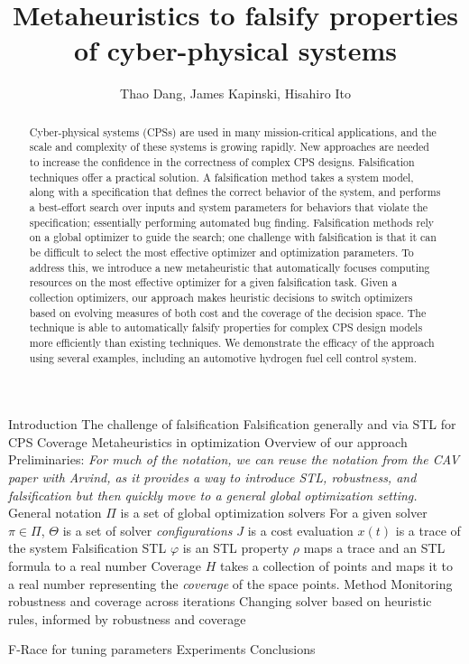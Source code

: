\documentclass[10pt,oneside,letterpaper]{article}
\title{Metaheuristics to falsify properties of cyber-physical systems}
\author{Thao Dang, James Kapinski, Hisahiro Ito}
\date{}
\begin{document}
\maketitle

\begin{abstract}
Cyber-physical systems (CPSs) are used in many mission-critical applications, and the scale and complexity of these systems is growing rapidly.
New approaches are needed to increase the confidence in the correctness of complex CPS designs.
Falsification techniques offer a practical solution. 
A falsification method takes a system model, along with a specification that defines the correct behavior of the system, and performs a best-effort search over inputs and system parameters for behaviors that violate the specification; essentially performing automated bug finding.
Falsification methods rely on a global optimizer to guide the search; one challenge with falsification is that it can be difficult to select the most effective optimizer and optimization parameters.
To address this, we introduce a new metaheuristic that automatically focuses computing resources on the most effective optimizer for a given falsification task.
Given a collection optimizers, our approach makes heuristic decisions to switch optimizers based on
evolving measures of both cost and the coverage of the decision space.
The technique is able to automatically falsify properties for complex CPS design models more efficiently than existing techniques.
We demonstrate the efficacy of the approach using several examples, including an automotive hydrogen fuel cell control system.

\end{abstract}

\begin{outline}[enumerate]
\1 Introduction
	\2 The challenge of falsification
	\2 Falsification generally and via STL for CPS
	\2 Coverage
	\2 Metaheuristics in optimization
	\2 Overview of our approach
\1 Preliminaries: \emph{For much of the notation, we can reuse the notation from the CAV paper with Arvind, as it provides a way to introduce STL, robustness, and falsification but then quickly move to a general global optimization setting.}
	\2 General notation
		\3 $\Pi$ is a set of global optimization solvers
		\3 For a given solver $\pi\in \Pi$, $\Theta$ is a set of solver \emph{configurations}
		\3 $J$ is a cost evaluation
		\3 $x(t)$ is a trace of the system
	\2 Falsification
	\2 STL
		\3 $\varphi$ is an STL property 
		\3 $\rho$ maps a trace and an STL formula to a real number
	\2 Coverage
		\3 $H$ takes a collection of points and maps it to a real number representing the \emph{coverage} of the space points.
\1 Method
	\2 Monitoring robustness and coverage across iterations
	\2 Changing solver based on heuristic rules, informed by robustness and coverage
	
	
	
	\2 F-Race for tuning parameters
\1 Experiments
\1 Conclusions
\end{outline}







 
\end{document}
